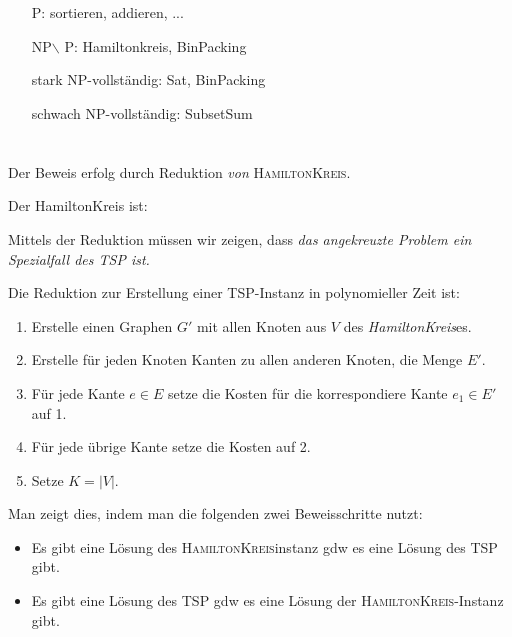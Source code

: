 \documentclass{article}
\begin{document}
\section{}
\begin{enumerate}
  \item[P:] sortieren, addieren, ...
  \item[NP$\backslash$ P:] Hamiltonkreis, BinPacking
  \item[stark NP-vollständig:] Sat, BinPacking
  \item[schwach NP-vollständig:] SubsetSum
\end{enumerate}

\section{}
Der Beweis erfolg durch Reduktion \emph{von} \textsc{HamiltonKreis}.

Der HamiltonKreis ist:

Mittels der Reduktion müssen wir zeigen, dass \emph{das angekreuzte Problem ein Spezialfall des TSP ist.}

Die Reduktion zur Erstellung einer TSP-Instanz in polynomieller Zeit ist:
\begin{enumerate}
	\item Erstelle einen Graphen $G'$ mit allen Knoten aus $V$ des \emph{HamiltonKreis}es. 
  \item Erstelle für jeden Knoten Kanten zu allen anderen Knoten, die Menge $E'$.
  \item Für jede Kante $e\in E$ setze die Kosten für die korrespondiere Kante $e_1\in E'$ auf 1.
  \item Für jede übrige Kante setze die Kosten auf 2.
  \item Setze $K = |V|$.
\end{enumerate}

Man zeigt dies, indem man die folgenden zwei Beweisschritte nutzt:
\begin{itemize}
	\item Es gibt eine Lösung des \textsc{HamiltonKreis}instanz gdw es eine Lösung des \textsc{TSP} gibt.
  \item Es gibt eine Lösung des \textsc{TSP} gdw es eine Lösung der \textsc{HamiltonKreis}-Instanz gibt.
\end{itemize}
\end{document}
